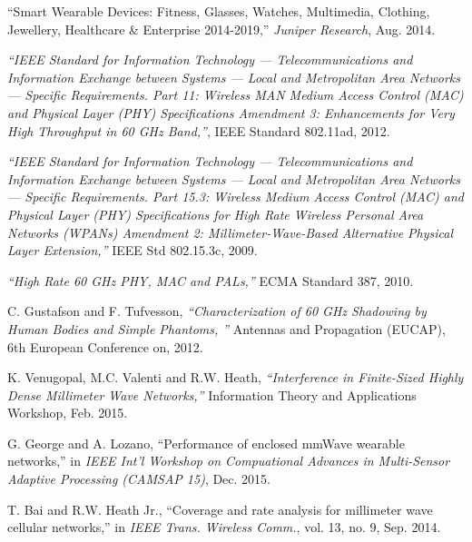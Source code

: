 \documentclass[10pt, conference, letterpaper]{IEEEtran}
\begin{document}
\begin{thebibliography}{50}
``Smart Wearable Devices: Fitness, Glasses, Watches, Multimedia, Clothing, Jewellery, Healthcare \& Enterprise 2014-2019,'' \emph{Juniper Research}, Aug. 2014.

\emph{``IEEE Standard for Information Technology — Telecommunications and Information Exchange between Systems — Local and Metropolitan Area Networks — Specific Requirements. Part 11: Wireless MAN Medium Access Control (MAC) and Physical Layer (PHY) Specifications Amendment 3: Enhancements for Very High Throughput in 60 GHz Band,''}, IEEE Standard 802.11ad, 2012.

\emph{``IEEE Standard for Information Technology — Telecommunications and Information Exchange between Systems — Local and Metropolitan Area Networks — Specific Requirements. Part 15.3: Wireless Medium Access Control (MAC) and Physical Layer (PHY) Specifications for High Rate Wireless Personal Area Networks (WPANs) Amendment 2: Millimeter-Wave-Based Alternative Physical Layer Extension,''} IEEE Std 802.15.3c, 2009.

\emph{``High Rate 60 GHz PHY, MAC and PALs,''} ECMA Standard 387, 2010.


C. Gustafson and F. Tufvesson, \emph{``Characterization of 60 GHz Shadowing by Human Bodies and Simple Phantoms, ''} Antennas and Propagation (EUCAP), 6th European Conference on, 2012.

K. Venugopal, M.C. Valenti and R.W. Heath, \emph{``Interference in Finite-Sized Highly Dense Millimeter Wave Networks,''} Information Theory and Applications Workshop, Feb. 2015.

G. George and A. Lozano, ``Performance of enclosed mmWave wearable networks,'' in \emph{IEEE Int'l Workshop on Compuational Advances in Multi-Sensor Adaptive Processing (CAMSAP 15)}, Dec. 2015.

T. Bai and R.W. Heath Jr., ``Coverage and rate analysis for millimeter wave cellular networks,'' in \emph{IEEE Trans. Wireless Comm.}, vol. 13, no. 9, Sep. 2014.


\end{thebibliography}
\end{document}
